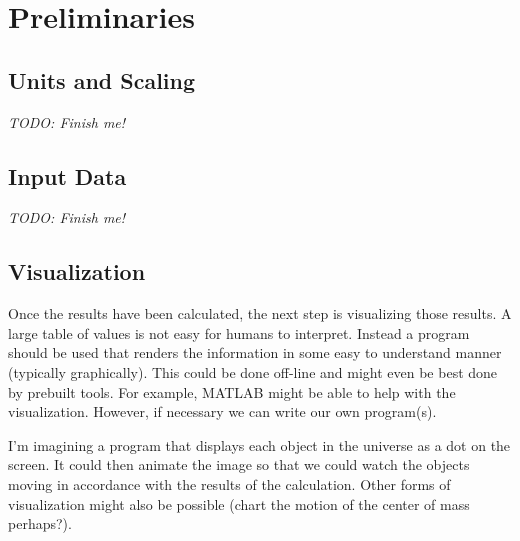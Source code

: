 
\section{Preliminaries}
\label{sec:preliminaries}

\subsection{Units and Scaling}

\textit{TODO: Finish me!}

\subsection{Input Data}

\textit{TODO: Finish me!}

\subsection{Visualization}

Once the results have been calculated, the next step is visualizing those results. A large table
of values is not easy for humans to interpret. Instead a program should be used that renders the
information in some easy to understand manner (typically graphically). This could be done
off-line and might even be best done by prebuilt tools. For example, MATLAB might be able to
help with the visualization. However, if necessary we can write our own program(s).

I'm imagining a program that displays each object in the universe as a dot on the screen. It
could then animate the image so that we could watch the objects moving in accordance with the
results of the calculation. Other forms of visualization might also be possible (chart the
motion of the center of mass perhaps?).
